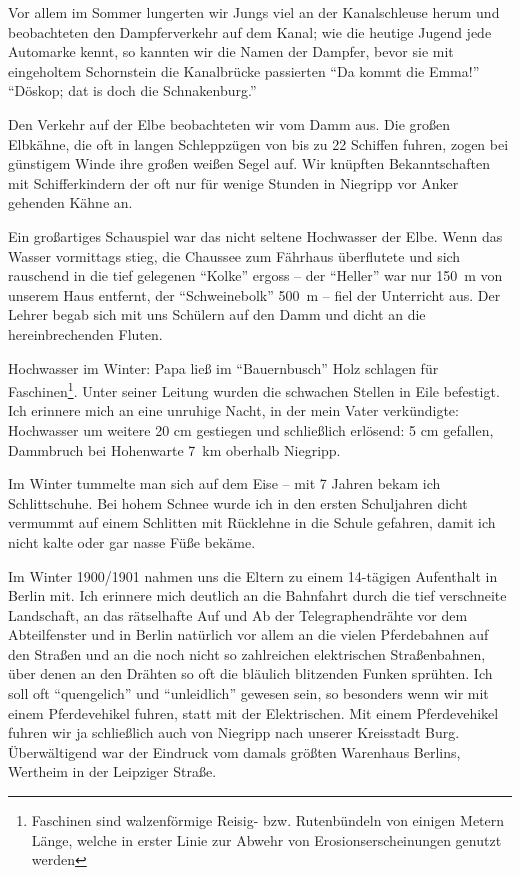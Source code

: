 Vor allem im Sommer lungerten wir Jungs viel an der Kanalschleuse herum und beobachteten den Dampferverkehr auf dem Kanal; wie die heutige Jugend jede Automarke kennt, so kannten wir die Namen der Dampfer, bevor sie mit eingeholtem Schornstein die Kanalbrücke passierten \enquote{Da kommt die Emma!} \enquote{Döskop; dat is doch die Schnakenburg.}

Den Verkehr auf der Elbe beobachteten wir vom Damm aus. Die großen Elbkähne, die oft in langen Schleppzügen von bis zu 22 Schiffen fuhren, zogen bei günstigem Winde ihre großen weißen Segel auf. Wir knüpften Bekanntschaften mit Schifferkindern der oft nur für wenige Stunden in Niegripp vor Anker gehenden Kähne an.

Ein großartiges Schauspiel war das nicht seltene Hochwasser der Elbe. Wenn das Wasser vormittags stieg, die Chaussee zum Fährhaus überflutete und sich rauschend in die tief gelegenen \enquote{Kolke} ergoss -- der \enquote{Heller} war nur 150~m von unserem Haus entfernt, der \enquote{Schweinebolk} 500~m -- fiel der Unterricht aus. Der Lehrer begab sich mit uns Schülern auf den Damm und dicht an die hereinbrechenden Fluten.

Hochwasser im Winter: Papa ließ im \enquote{Bauernbusch} Holz schlagen für Faschinen\footnote{Faschinen sind walzenförmige Reisig- bzw. Rutenbündeln von einigen Metern Länge, welche in erster Linie zur Abwehr von Erosionserscheinungen genutzt werden}. Unter seiner Leitung wurden die schwachen Stellen in Eile befestigt. Ich erinnere mich an eine unruhige Nacht, in der mein Vater verkündigte: Hochwasser um weitere 20 cm gestiegen und schließlich erlösend: 5 cm gefallen, Dammbruch bei Hohenwarte 7~km oberhalb Niegripp.

Im Winter tummelte man sich auf dem Eise -- mit 7 Jahren bekam ich Schlittschuhe. Bei hohem Schnee wurde ich in den ersten Schuljahren dicht vermummt auf einem Schlitten mit Rücklehne in die Schule gefahren, damit ich nicht kalte oder gar nasse Füße bekäme.

Im Winter 1900/1901 nahmen uns die Eltern zu einem 14-tägigen Aufenthalt in Berlin mit. Ich erinnere mich deutlich an die Bahnfahrt durch die tief verschneite Landschaft, an das rätselhafte Auf und Ab der Telegraphendrähte vor dem Abteilfenster und in Berlin natürlich vor allem an die vielen Pferdebahnen auf den Straßen und an die noch nicht so zahlreichen elektrischen Straßenbahnen, über denen an den Drähten so oft die bläulich blitzenden Funken sprühten. Ich soll oft \enquote{quengelich} und \enquote{unleidlich} gewesen sein, so besonders wenn wir mit einem Pferdevehikel fuhren, statt mit der Elektrischen. Mit einem Pferdevehikel fuhren wir ja schließlich auch von Niegripp nach unserer Kreisstadt Burg. Überwältigend war der Eindruck vom damals größten Warenhaus Berlins, Wertheim in der Leipziger Straße.

